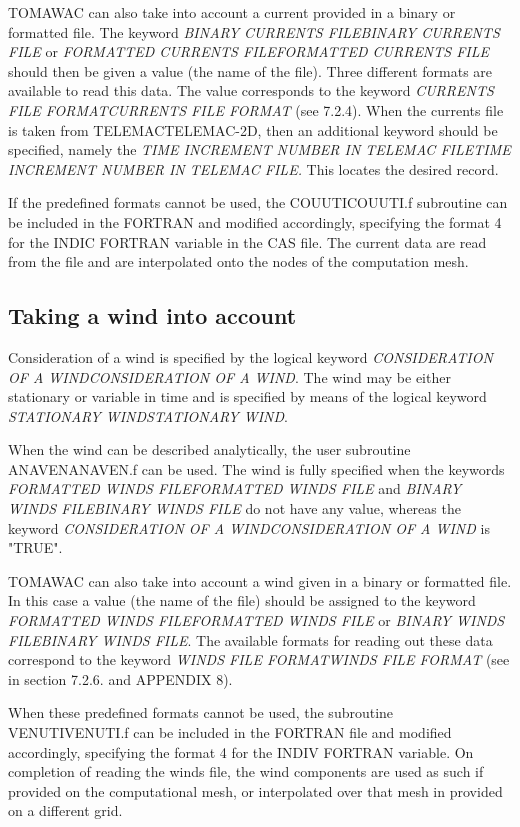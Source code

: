 TOMAWAC can also take into account a current provided in a binary or formatted file. The keyword \textit{BINARY CURRENTS FILEBINARY CURRENTS FILE }or\textit{ FORMATTED CURRENTS FILEFORMATTED CURRENTS FILE} should then be given a value (the name of the file). Three different formats are available to read this data. The value corresponds to the keyword \textit{CURRENTS FILE FORMATCURRENTS FILE FORMAT} (see 7.2.4). When the currents file is taken from TELEMACTELEMAC-2D, then an additional keyword should be specified, namely the \textit{TIME INCREMENT NUMBER IN TELEMAC FILETIME INCREMENT NUMBER IN TELEMAC FILE.} This locates the desired record.

 If the predefined formats cannot be used, the COUUTICOUUTI.f subroutine can be included in the FORTRAN and modified accordingly, specifying the format 4 for the INDIC FORTRAN variable in the CAS file. The current data are read from the file and are interpolated onto the nodes of the computation mesh.


\subsection{ Taking a wind into account}

 Consideration of a wind is specified by the logical keyword \textit{CONSIDERATION OF A WINDCONSIDERATION OF A WIND}. The wind may be either stationary or variable in time and is specified by means of the logical keyword \textit{STATIONARY WINDSTATIONARY WIND}.

 When the wind can be described analytically, the user subroutine ANAVENANAVEN.f can be used. The wind is fully specified when the keywords \textit{FORMATTED WINDS FILEFORMATTED WINDS FILE} and \textit{BINARY WINDS FILEBINARY WINDS FILE }do not have any value, whereas the keyword \textit{CONSIDERATION OF A WINDCONSIDERATION OF A WIND }is "TRUE".

 TOMAWAC can also take into account a wind given in a binary or formatted file. In this case a value (the name of the file) should be assigned to the keyword \textit{FORMATTED WINDS FILEFORMATTED WINDS FILE }or \textit{BINARY WINDS FILEBINARY WINDS FILE}. The available formats for reading out these data correspond to the keyword \textit{WINDS FILE FORMATWINDS FILE FORMAT} (see in section 7.2.6. and APPENDIX 8).

 When these predefined formats cannot be used, the subroutine VENUTIVENUTI.f can be included in the FORTRAN file and modified accordingly, specifying the format 4 for the INDIV FORTRAN variable. On completion of reading the winds file, the wind components are used as such if provided on the computational mesh, or interpolated over that mesh in provided on a different grid.

